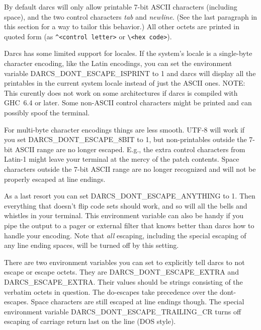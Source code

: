 By default darcs will only allow printable 7-bit ASCII characters (including space),
and the two control characters \emph{tab} and \emph{newline}.
(See the last paragraph in this section for a way to tailor this behavior.)
All other octets are printed in quoted form (as \verb!^<control letter>! or
\verb!\!\verb!<hex code>!).

Darcs has some limited support for locales.
If the system's locale is a single-byte character encoding,
like the Latin encodings,
you can set the environment variable DARCS\_DONT\_ESCAPE\_ISPRINT to 1
and darcs will display all the printables in the current system locale
instead of just the ASCII ones.
NOTE: This curently does not work on some architectures if darcs is
compiled with GHC~6.4 or later. Some non-ASCII control characters might be printed
and can possibly spoof the terminal.

For multi-byte character encodings things are less smooth.
UTF-8 will work if you set DARCS\_DONT\_ESCAPE\_8BIT to 1,
but non-printables outside the 7-bit ASCII range are no longer escaped.
E.g., the extra control characters from Latin-1
might leave your terminal at the mercy of the patch contents.
Space characters outside the 7-bit ASCII range are no longer recognized
and will not be properly escaped at line endings.

As a last resort you can set DARCS\_DONT\_ESCAPE\_ANYTHING to 1.
Then everything that doesn't flip code sets should work,
and so will all the bells and whistles in your terminal.
This environment variable can also be handy
if you pipe the output to a pager or external filter
that knows better than darcs how to handle your encoding.
Note that \emph{all} escaping,
including the special escaping of any line ending spaces,
will be turned off by this setting.

There are two environment variables you can set
to explicitly tell darcs to not escape or escape octets.
They are
DARCS\_DONT\_ESCAPE\_EXTRA and DARCS\_ESCAPE\_EXTRA.
Their values should be strings consisting of the verbatim octets in question.
The do-escapes take precedence over the dont-escapes.
Space characters are still escaped at line endings though.
The special environment variable DARCS\_DONT\_ESCAPE\_TRAILING\_CR
turns off escaping of carriage return last on the line (DOS style).
